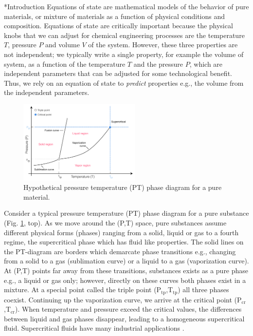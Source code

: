 \documentclass[11pt]{article}
\makeatletter
\theoremstyle{definition}
\renewcommand\subsection{\@startsection
	{subsection}{2}{0mm}
	{-0.05in}
	{0.5\baselineskip}
	{\normalfont\normalsize\bfseries}}
\makeatother
\begin{document}
\clearpage


\subsection*{Introduction}
Equations of state are mathematical models of the behavior of pure materials, or mixture of materials as a function of physical conditions and composition.
Equations of state are critically important because the physical knobs that we can adjust for chemical engineering processes
are the temperature $T$, pressure $P$ and volume $V$ of the system.
However, these three properties are not independent;
we typically write a single property, for example the volume of system, as a function of the temperature $T$ and the pressure $P$, which
are independent parameters that can be adjusted for some technological benefit. Thus, we rely on an equation of state to \emph{predict} properties e.g., the volume
from the independent parameters.

\begin{figure}\center
\includegraphics[width=0.54\textwidth]{./figs/PT-Diagram.pdf}
\caption{Hypothetical pressure temperature (PT) phase diagram for a pure material.}\label{fig-phase-diagrams}
\end{figure}

Consider a typical pressure temperature (PT) phase diagram for a pure substance (Fig. \ref{fig-phase-diagrams}, top).
As we move around the (P,T) space, pure substances assume different physical forms (phases) ranging from a solid, liquid or gas to a fourth regime,
the supercritical phase which has fluid like properties.
The solid lines on the PT-diagram are borders which demarcate phase transitions e.g., changing from a solid to a gas (sublimation curve)
or a liquid to a gas (vaporization curve).
At (P,T) points far away from these transitions, substances exists as a pure phase e.g., a liquid or gas only;
however, directly on these curves both phases exist in a mixture.
At a special point called the triple point (P$_{\mathrm{tp}}$,T$_{\mathrm{tp}}$) all three phases coexist.
Continuing up the vaporization curve, we arrive at the critical point (P$_{\mathrm{cr}}$,T$_{\mathrm{cr}}$).
When temperature and pressure exceed the critical values, the differences between liquid and gas phases disappear,
leading to a homogeneous supercritical fluid.
Supercritical fluids have many industrial applications \cite{SupercriticalFluids}.
\end{document}
